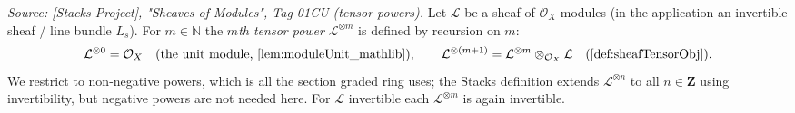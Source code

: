 \begin{definition}\leanok
  \label{def:sheafTensorPow}
  \textit{Source: [Stacks Project], "Sheaves of Modules", Tag 01CU (tensor
  powers).}
  Let \(\mathcal{L}\) be a sheaf of \(\mathcal{O}_X\)-modules (in the application
  an invertible sheaf / line bundle \(L_s\)). For \(m \in \mathbb{N}\) the
  \emph{\(m\)th tensor power} \(\mathcal{L}^{\otimes m}\) is defined by recursion
  on \(m\):
  \[
    \mathcal{L}^{\otimes 0} = \mathcal{O}_X
      \quad(\text{the unit module, \cref{lem:moduleUnit_mathlib}}),
    \qquad
    \mathcal{L}^{\otimes (m+1)}
      = \mathcal{L}^{\otimes m} \otimes_{\mathcal{O}_X} \mathcal{L}
        \quad(\cref{def:sheafTensorObj}).
  \]
  We restrict to non-negative powers, which is all the section graded ring uses;
  the Stacks definition extends \(\mathcal{L}^{\otimes n}\) to all
  \(n \in \mathbf{Z}\) using invertibility, but negative powers are not needed
  here. For \(\mathcal{L}\) invertible each \(\mathcal{L}^{\otimes m}\) is again
  invertible.
\end{definition}

